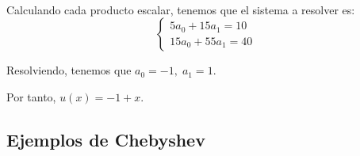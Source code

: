 \begin{ejemplo}
\begin{equation*}
\begin{array}{c|c|c|c|c|c|c}
        \end{array}
    \end{equation*}

    Calculando cada producto escalar, tenemos que el sistema a resolver es:
    \begin{equation*}
        \left\{\begin{array}{c}
            5a_0 + 15a_1 = 10 \\
            15a_0 + 55a_1 = 40
        \end{array}\right.
    \end{equation*}

    Resolviendo, tenemos que $a_0=-1,\;a_1=1$.

    Por tanto, $u(x)=-1+x$.
\end{ejemplo}

\subsection{Ejemplos de Chebyshev}

